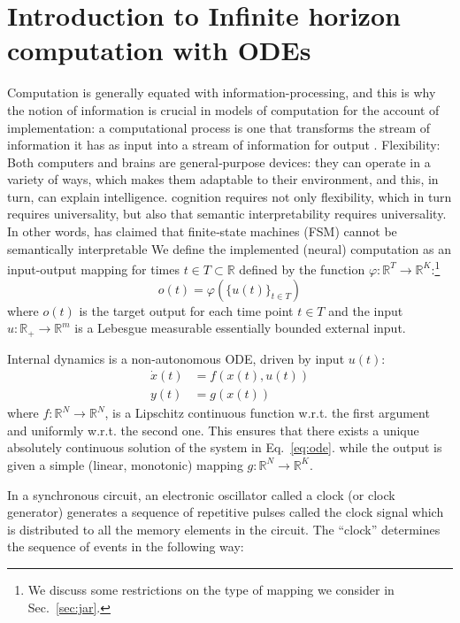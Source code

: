 \documentclass{scrartcl}
\theoremstyle{definition}
\theoremstyle{remark}
\newcommand{\reals}{\mathbb{R}}
\begin{document}
\section{Introduction to Infinite horizon computation with ODEs}	
Computation is generally equated with information-processing, and this is why the notion of information is crucial in models of computation for the account of implementation: a computational process is one that transforms the stream of information it has as input into a stream of information for output \citep{milkowski2014}.
Flexibility: Both computers and brains are general‑purpose devices: they can operate in a variety of ways, which makes them adaptable to their environment, and this, in turn, can explain intelligence. \citep{milkowski2018computermetaphor}
cognition requires not only flexibility, which in turn requires universality, but also that semantic interpretability requires universality.
 In other words, \citep{pylyshyn1984} has claimed that finite‑state machines (FSM) cannot be semantically interpretable
We define the implemented (neural) computation as an input-output mapping for times $t\in T\subset\reals$ defined by the function $\varphi:\reals^T\rightarrow\reals^K$:\footnote{We discuss some restrictions on the type of mapping we consider in Sec.~\ref{sec:jar}.}
\begin{equation}
o(t) = \varphi(\{u(t)\}_{t\in T})
\end{equation}
where $o(t)$ is the target output for each time point $t\in T$ and the input  $u:\reals_{+}\to \reals^{m}$  is a Lebesgue measurable essentially bounded external input.

Internal dynamics is a non-autonomous ODE, driven by input $u(t)$:
\begin{align}
\dot x(t) &= f(x(t),u(t))\label{eq:ode}\\
y(t) &= g(x(t))	\label{eq:output}
\end{align}
where $f:\reals^N\rightarrow\reals^N$, is a Lipschitz continuous function w.r.t. the first argument and uniformly w.r.t. the second one. This ensures that there exists a unique absolutely continuous solution of the system in Eq.~\ref{eq:ode}.
while the output is given a simple (linear, monotonic) mapping $g:\reals^N\rightarrow\reals^K$.

In a synchronous circuit, an electronic oscillator called a clock (or clock generator) generates a sequence of repetitive pulses called the clock signal which is distributed to all the memory elements in the circuit. 
The ``clock'' determines the sequence of events in the following way:
\end{document}
